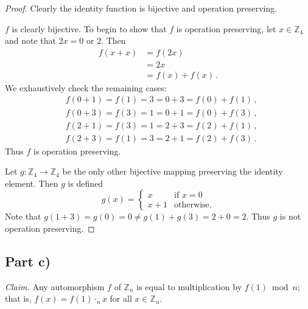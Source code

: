 \documentclass{abrice}
\newcommand{\Z}{\mathbb{Z}}
\newcommand{\Claim}{\noindent\emph{Claim.}\xspace}%
\begin{document}
\begin{proof}
  Clearly the identity function is bijective and operation preserving.

  $f$ is clearly bijective. To begin to show that $f$ is operation preserving, let $x \in
  \Z_4$ and note that $2x = 0$ or $2$. Then
  \begin{align*}
    f(x + x)
    &= f(2x) \\
    &= 2x \\
    &= f(x) + f(x)\, .
  \end{align*}
  We exhaustively check the remaining cases:
  \begin{align*}
    &f(0 + 1) = f(1) = 3 = 0 + 3 = f(0) + f(1)\, , \\
    &f(0 + 3) = f(3) = 1 = 0 + 1 = f(0) + f(3)\, , \\
    &f(2 + 1) = f(3) = 1 = 2 + 3 = f(2) + f(1)\, , \\
    &f(2 + 3) = f(1) = 3 = 2 + 1 = f(2) + f(3)\, .
  \end{align*}
  Thus $f$ is operation preserving.

  Let $g : \Z_4 \to \Z_4$ be the only other bijective mapping preserving the
  identity element. Then $g$ is defined
  \[
    g(x) =
    \begin{cases}
      x &\text{if } x = 0 \\
      x + 1 &\text{otherwise.}
    \end{cases}
  \]
  Note that $g(1 + 3) = g(0) = 0 \neq g(1) + g(3) = 2 + 0 = 2$. Thus $g$ is not
  operation preserving.
\end{proof}


\subsection{Part c)}

\Claim Any automorphism $f$ of $\Z_n$ is equal to multiplication by $f(1) \bmod
n$; that is, $f(x) = f(1) \cdot_n x$ for all $x \in \Z_n$.
\end{document}
